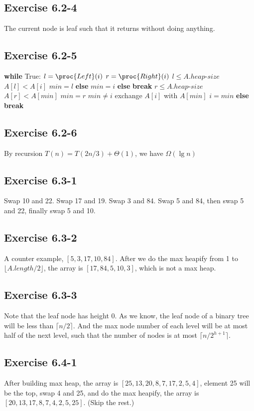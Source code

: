 \documentclass[12pt]{article}
\theoremstyle{definition}
\theoremstyle{remark}
\begin{document}
\subsection*{Exercise 6.2-4}
The current node is leaf such that it returns without doing anything.
\subsection*{Exercise 6.2-5}
\begin{codebox}
\li \textbf{while} True:
\li \quad $l=\proc{Left}(i)$
\li \quad $r=\proc{Right}(i)$
\li \quad \If $l\le A.heap\text{-}size$
\li \qquad \If $A[l]<A[i]$ $min=l$
\li \qquad \textbf{else} $min=i$
\li \quad \textbf{else}
\li \qquad \textbf{break}
\li \quad \If $r\le A.heap\text{-}size$
\li \qquad \If $A[r]<A[min]$ $min=r$
\li \quad \If $min\ne i$
\li \qquad exchange $A[i]$ with $A[min]$
\li \qquad $i=min$
\li \quad \textbf{else}
\li \qquad \textbf{break}
\end{codebox}
\subsection*{Exercise 6.2-6}
By recursion $T(n)=T(2n/3)+\Theta(1)$, we have $\Omega(\lg{n})$
\subsection*{Exercise 6.3-1}
Swap 10 and 22. Swap 17 and 19. Swap 3 and 84. Swap 5 and 84, then swap 5 and 22, finally swap 5 and 10.
\subsection*{Exercise 6.3-2}
A counter example, $[5,3,17,10,84]$. After we do the max heapify from 1 to $\lfloor A.length/2\rfloor$, the array is $[17,84,5,10,3]$, which is not a max heap.
\subsection*{Exercise 6.3-3}
Note that the leaf node has height 0. As we know, the leaf node of a binary tree will be less than $\lceil n/2\rceil$. And the max node number of each level will be at most half of the next level, such that the number of nodes is at most $\lceil n/2^{h+1}\rceil$.
\subsection*{Exercise 6.4-1}
After building max heap, the array is $[25,13,20,8,7,17,2,5,4]$, element 25 will be the top, swap 4 and 25, and do the max heapify, the array is $[20,13,17,8,7,4,2,5,25]$. (Skip the rest.)
\end{document}
